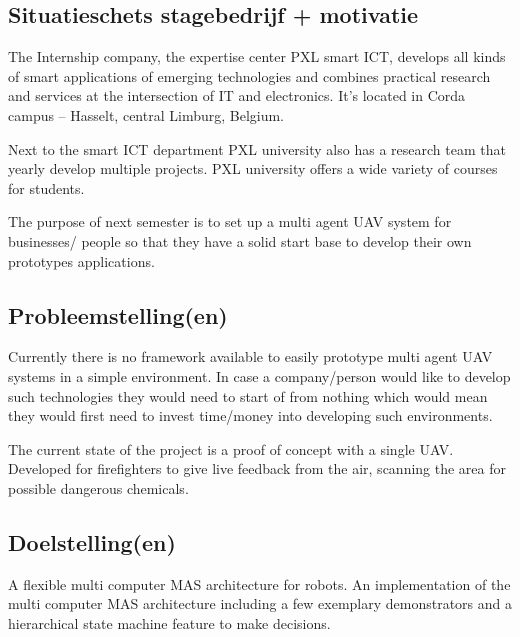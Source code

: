 \subsection{Situatieschets stagebedrijf + motivatie}
  The Internship company, the expertise center PXL smart ICT, develops all kinds of smart applications of emerging technologies and combines practical research and services at the intersection of IT and electronics. It’s located in Corda campus – Hasselt, central Limburg, Belgium. 

  Next to the smart ICT department PXL university also has a research team that yearly develop multiple projects. PXL university offers a wide variety of courses for students. 

  The purpose of next semester is to set up a multi agent UAV system for businesses/ people so that they have a solid start base to develop their own prototypes applications.
\newpage

\subsection{Probleemstelling(en)}
  Currently there is no framework available to easily prototype multi agent UAV systems in a simple environment. In case a company/person would like to develop such technologies they would need to start of from nothing which would mean they would first need to invest time/money into developing such environments.

The current state of the project is a proof of concept with a single UAV. Developed for firefighters to give live feedback from the air, scanning the area for possible dangerous chemicals.
\newpage

\subsection{Doelstelling(en)}
  A flexible multi computer MAS architecture for robots. An implementation of the multi computer MAS architecture including a few exemplary demonstrators and a hierarchical state machine feature to make decisions. 

